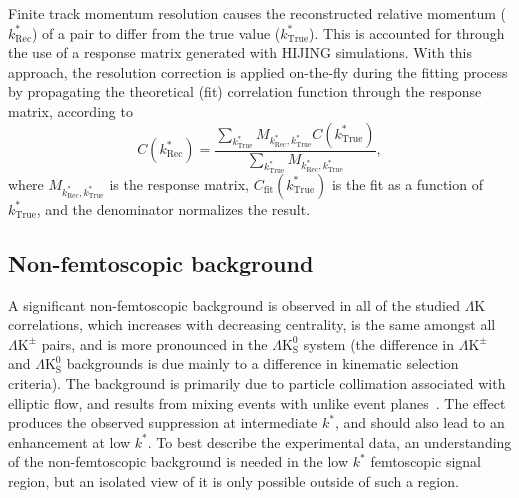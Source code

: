 \documentclass[ALICE,manyauthors]{cernphprep}
\newcommand{\kstar}{$k^{*}$\xspace}
\newcommand{\ktrue}{$k^{*}_{\mathrm{True}}$\xspace}
\newcommand{\krec}{$k^{*}_{\mathrm{Rec}}$\xspace}
\newcommand{\LamK}{$\Lambda$K\xspace}
\newcommand{\LamKpm}{$\Lambda\mathrm{K^{\pm}}$\xspace}
\newcommand{\LamKs}{$\Lambda\mathrm{K^{0}_{S}}$\xspace}
\begin{document}
Finite track momentum resolution causes the reconstructed relative momentum (\krec) of a pair to differ from the true value (\ktrue).
This is accounted for through the use of a response matrix generated with HIJING simulations.
With this approach, the resolution correction is applied on-the-fly during the fitting process by propagating the theoretical (fit) correlation function through the response matrix, according to
\begin{equation}
  C(k^{*}_{\mathrm{Rec}}) = \dfrac{\sum\limits_{k^{*}_{\mathrm{True}}}M_{k^{*}_{\mathrm{Rec}},k^{*}_{\mathrm{True}}}C(k^{*}_{\mathrm{True}})}{\sum\limits_{k^{*}_{\mathrm{True}}}M_{k^{*}_{\mathrm{Rec}},k^{*}_{\mathrm{True}}}},
\label{eqn:MomResCorrection}
\end{equation}
where $M_{k^{*}_{\mathrm{Rec}},k^{*}_{\mathrm{True}}}$ is the response matrix, $C_{\mathrm{fit}}(k^{*}_{\mathrm{True}})$ is the fit as a function of \ktrue, and the denominator normalizes the result.


\subsection{Non-femtoscopic background}
\label{NonFlatBackground}

A significant non-femtoscopic background is observed in all of the studied \LamK correlations, which increases with decreasing centrality, is the same amongst all \LamKpm pairs, and is more pronounced in the \LamKs system (the difference in \LamKpm and \LamKs backgrounds is due mainly to a difference in kinematic selection criteria).  
The background is primarily due to particle collimation associated with elliptic flow, and results from mixing events with unlike event planes~\cite{Kisiel:2017}.
The effect produces the observed suppression at intermediate \kstar, and should also lead to an enhancement at low \kstar.
To best describe the experimental data, an understanding of the non-femtoscopic background is needed in the low \kstar femtoscopic signal region, but an isolated view of it is only possible outside of such a region.
\end{document}
